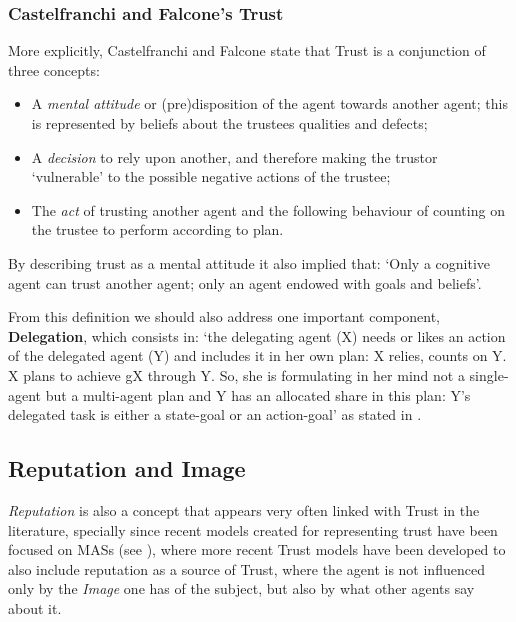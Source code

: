 \subsubsection{Castelfranchi and Falcone's Trust}
\label{subsubsec:CastelfranchiTrust}
More explicitly, Castelfranchi and Falcone\cite{Castelfranchi1998} state that Trust is a conjunction of three concepts:
\begin{itemize}
	\item A \textit{mental attitude} or (pre)disposition of the agent towards another agent; this is represented by beliefs about the trustees qualities and defects;
	\item A \textit{decision} to rely upon another, and therefore making the trustor `vulnerable' to the possible negative actions of the trustee;
	\item The \textit{act} of trusting another agent and the following behaviour of counting on the trustee to perform according to plan. 
\end{itemize}
By describing trust as a mental attitude it also implied that: `Only a cognitive agent can trust another agent; only an agent endowed with goals and beliefs'\cite{Castelfranchi2010}.

From this definition we should also address one important component, \textbf{Delegation}, which consists in: `the delegating agent (X) needs or likes an action of the delegated agent (Y) and includes it in her own plan: X relies, counts on Y. X plans to achieve gX through Y. So, she is formulating in her mind not a single-agent but a multi-agent plan and Y has an allocated share in this plan: Y’s delegated task is either a state-goal or an action-goal' as stated in \cite{Castelfranchi1998}.



\subsection{Reputation and Image}
\label{subsec:Reputation}
\textit{Reputation} is also a concept that appears very often linked with Trust in the literature, specially since recent models created for representing trust have been focused on \acp{MAS} (see \cite{Abdul-rahman2000, Sabater2002, Sabater2006, Huynh2006, Pinyol2009}), where more recent Trust models have been developed to also include reputation as a source of Trust, where the agent is not influenced only by the \textit{Image} one has of the subject, but also by what other agents say about it.


